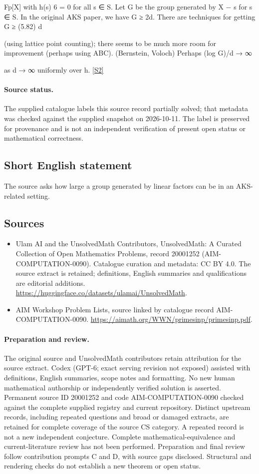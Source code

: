 \documentclass[11pt]{article}
\newcommand{\sref}[2]{\hyperlink{source:#1:#2}{[S#2]}}
\begin{document}
Fp[X] with h(s) 6 = 0 for all s ∈ S. Let G be the group generated by X − s for s ∈ S. In the original AKS paper, we have G ≥ 2d. There are techniques for getting G ≥ (5.82) d

(using lattice point counting); there seems to be much more room for improvement (perhaps using ABC). (Bernstein, Voloch) Perhaps (log G)/d → ∞

as d → ∞ uniformly over h. \sref{20001252}{2}
\paragraph{Source status.}
The supplied catalogue labels this source record partially solved; that metadata was checked against the supplied snapshot on 2026-10-11. The label is preserved for provenance and is not an independent verification of present open status or mathematical correctness.
\subsection{Short English statement}
The source asks how large a group generated by linear factors can be in an AKS-related setting.
\subsection{Sources}
\begin{itemize}
\item[\hypertarget{source:20001252:1}{S1}] Ulam AI and the UnsolvedMath Contributors, UnsolvedMath: A Curated Collection of Open Mathematics Problems, record 20001252 (AIM-COMPUTATION-0090). Catalogue curation and metadata: CC BY 4.0. The source extract is retained; definitions, English summaries and qualifications are editorial additions.
\url{https://huggingface.co/datasets/ulamai/UnsolvedMath}.
\item[\hypertarget{source:20001252:2}{S2}] AIM Workshop Problem Lists, source linked by catalogue record AIM-COMPUTATION-0090.
\url{https://aimath.org/WWN/primesinp/primesinp.pdf}.
\end{itemize}
\paragraph{Preparation and review.}
The original source and UnsolvedMath contributors retain attribution for the source extract. Codex (GPT-6; exact serving revision not exposed) assisted with definitions, English summaries, scope notes and formatting. No new human mathematical authorship or independently verified solution is asserted. Permanent source ID 20001252 and code AIM-COMPUTATION-0090 checked against the complete supplied registry and current repository. Distinct upstream records, including repeated questions and broad or damaged extracts, are retained for complete coverage of the source CS category. A repeated record is not a new independent conjecture. Complete mathematical-equivalence and current-literature review has not been performed. Preparation and final review follow contribution prompts C and D, with source gaps disclosed. Structural and rendering checks do not establish a new theorem or open status.
\label{end:20001252}
\end{document}
